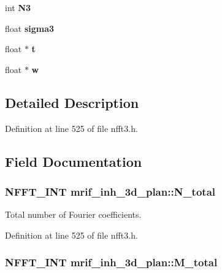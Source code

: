 \begin{DoxyCompactItemize}
\item 
\hypertarget{structmrif__inh__3d__plan_ab63634a14a15edd68fbd75d25fe15b5e}{int {\bfseries N3}}\label{structmrif__inh__3d__plan_ab63634a14a15edd68fbd75d25fe15b5e}

\item 
\hypertarget{structmrif__inh__3d__plan_a1e9410e5e47340d676ceefb7168ab110}{float {\bfseries sigma3}}\label{structmrif__inh__3d__plan_a1e9410e5e47340d676ceefb7168ab110}

\item 
\hypertarget{structmrif__inh__3d__plan_a36265c182dd339b4b38b7af8fa70f98c}{float $\ast$ {\bfseries t}}\label{structmrif__inh__3d__plan_a36265c182dd339b4b38b7af8fa70f98c}

\item 
\hypertarget{structmrif__inh__3d__plan_a00ec124b509d9b222c9ce3cf2bb47ac8}{float $\ast$ {\bfseries w}}\label{structmrif__inh__3d__plan_a00ec124b509d9b222c9ce3cf2bb47ac8}

\end{DoxyCompactItemize}


\subsection{Detailed Description}


Definition at line 525 of file nfft3.\-h.



\subsection{Field Documentation}
\hypertarget{structmrif__inh__3d__plan_a9ccd5c85ac960517ad0bf988174b263f}{
\subsubsection[{N\-\_\-total}]{\setlength{\rightskip}{0pt plus 5cm}N\-F\-F\-T\-\_\-\-I\-N\-T mrif\-\_\-inh\-\_\-3d\-\_\-plan\-::\-N\-\_\-total}}\label{structmrif__inh__3d__plan_a9ccd5c85ac960517ad0bf988174b263f}


Total number of Fourier coefficients. 



Definition at line 525 of file nfft3.\-h.

\hypertarget{structmrif__inh__3d__plan_a644e4dd77b345fc0c927dfa2edbc223a}{
\subsubsection[{M\-\_\-total}]{\setlength{\rightskip}{0pt plus 5cm}N\-F\-F\-T\-\_\-\-I\-N\-T mrif\-\_\-inh\-\_\-3d\-\_\-plan\-::\-M\-\_\-total}}\label{structmrif__inh__3d__plan_a644e4dd77b345fc0c927dfa2edbc223a}


